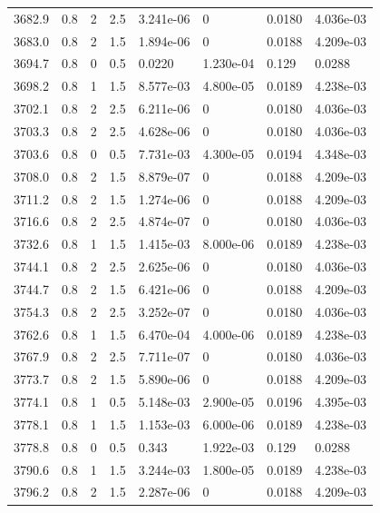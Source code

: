\documentclass[preview]{standalone}
\begin{document}
{{{{{{{{{{{{{{\begin{tabular}{L{1.2cm}C{1.2cm} C{0.3cm}C{0.5cm} C{1.4cm}C{1.4cm} C{1.4cm}C{1.4cm}}
  3682.9  &   0.8  & 2     & 2.5 &  3.241e-06  & 0  & 0.0180 &  4.036e-03   \\ 
  3683.0  &   0.8  & 2     & 1.5 &  1.894e-06  & 0  & 0.0188 &  4.209e-03   \\ 
  3694.7  &   0.8  & 0     & 0.5 &  0.0220  & 1.230e-04  & 0.129 &  0.0288   \\ 
  3698.2  &   0.8  & 1     & 1.5 &  8.577e-03  & 4.800e-05  & 0.0189 &  4.238e-03   \\ 
  3702.1  &   0.8  & 2     & 2.5 &  6.211e-06  & 0  & 0.0180 &  4.036e-03   \\ 
  3703.3  &   0.8  & 2     & 2.5 &  4.628e-06  & 0  & 0.0180 &  4.036e-03   \\ 
  3703.6  &   0.8  & 0     & 0.5 &  7.731e-03  & 4.300e-05  & 0.0194 &  4.348e-03   \\ 
  3708.0  &   0.8  & 2     & 1.5 &  8.879e-07  & 0  & 0.0188 &  4.209e-03   \\ 
  3711.2  &   0.8  & 2     & 1.5 &  1.274e-06  & 0  & 0.0188 &  4.209e-03   \\ 
  3716.6  &   0.8  & 2     & 2.5 &  4.874e-07  & 0  & 0.0180 &  4.036e-03   \\ 
  3732.6  &   0.8  & 1     & 1.5 &  1.415e-03  & 8.000e-06  & 0.0189 &  4.238e-03   \\ 
  3744.1  &   0.8  & 2     & 2.5 &  2.625e-06  & 0  & 0.0180 &  4.036e-03   \\ 
  3744.7  &   0.8  & 2     & 1.5 &  6.421e-06  & 0  & 0.0188 &  4.209e-03   \\ 
  3754.3  &   0.8  & 2     & 2.5 &  3.252e-07  & 0  & 0.0180 &  4.036e-03   \\ 
  3762.6  &   0.8  & 1     & 1.5 &  6.470e-04  & 4.000e-06  & 0.0189 &  4.238e-03   \\ 
  3767.9  &   0.8  & 2     & 2.5 &  7.711e-07  & 0  & 0.0180 &  4.036e-03   \\ 
  3773.7  &   0.8  & 2     & 1.5 &  5.890e-06  & 0  & 0.0188 &  4.209e-03   \\ 
  3774.1  &   0.8  & 1     & 0.5 &  5.148e-03  & 2.900e-05  & 0.0196 &  4.395e-03   \\ 
  3778.1  &   0.8  & 1     & 1.5 &  1.153e-03  & 6.000e-06  & 0.0189 &  4.238e-03   \\ 
  3778.8  &   0.8  & 0     & 0.5 &  0.343  & 1.922e-03  & 0.129 &  0.0288   \\ 
  3790.6  &   0.8  & 1     & 1.5 &  3.244e-03  & 1.800e-05  & 0.0189 &  4.238e-03   \\ 
  3796.2  &   0.8  & 2     & 1.5 &  2.287e-06  & 0  & 0.0188 &  4.209e-03   \\ 

\end{tabular}}}}}}}}}}}}}}}
\end{document}
